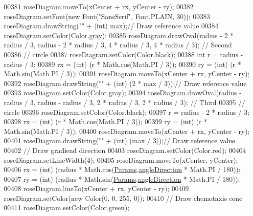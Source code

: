 \begin{DoxyCode}
00381     roseDiagram.moveTo(xCenter + rx, yCenter - ry);
00382     roseDiagram.setFont(\textcolor{keyword}{new} Font(\textcolor{stringliteral}{"SansSerif"}, Font.PLAIN, 30));
00383     roseDiagram.drawString(\textcolor{stringliteral}{""} + (\textcolor{keywordtype}{int}) max);\textcolor{comment}{// Draw reference value}
00384     roseDiagram.setColor(Color.gray);
00385     roseDiagram.drawOval(radius - 2 * radius / 3, radius - 2 * radius / 3, 4 * radius / 3, 4 * radius / 3);
       \textcolor{comment}{// Second}
00386                                                                                                            
       \textcolor{comment}{// circle}
00387     roseDiagram.setColor(Color.black);
00388     \textcolor{keywordtype}{int} r = radius - radius / 3;
00389     rx = (int) (r * Math.cos(Math.PI / 3));
00390     ry = (int) (r * Math.sin(Math.PI / 3));
00391     roseDiagram.moveTo(xCenter + rx, yCenter - ry);
00392     roseDiagram.drawString(\textcolor{stringliteral}{""} + (\textcolor{keywordtype}{int}) (2 * max / 3));\textcolor{comment}{// Draw reference value}
00393     roseDiagram.setColor(Color.gray);
00394     roseDiagram.drawOval(radius - radius / 3, radius - radius / 3, 2 * radius / 3, 2 * radius / 3); \textcolor{comment}{//
       Third}
00395                                                                                                     \textcolor{comment}{//
       circle}
00396     roseDiagram.setColor(Color.black);
00397     r = radius - 2 * radius / 3;
00398     rx = (int) (r * Math.cos(Math.PI / 3));
00399     ry = (int) (r * Math.sin(Math.PI / 3));
00400     roseDiagram.moveTo(xCenter + rx, yCenter - ry);
00401     roseDiagram.drawString(\textcolor{stringliteral}{""} + (\textcolor{keywordtype}{int}) (max / 3));\textcolor{comment}{// Draw reference value}
00402     \textcolor{comment}{// Draw gradiend direction}
00403     roseDiagram.setColor(Color.red);
00404     roseDiagram.setLineWidth(4);
00405     roseDiagram.moveTo(xCenter, yCenter);
00406     rx = (int) (radius * Math.cos(\hyperlink{classdata_1_1_params}{Params}.\hyperlink{classdata_1_1_params_a11ad187f45e1f7add56bde4071bfdf74}{angleDirection} * Math.PI / 180));
00407     ry = (int) (radius * Math.sin(\hyperlink{classdata_1_1_params}{Params}.\hyperlink{classdata_1_1_params_a11ad187f45e1f7add56bde4071bfdf74}{angleDirection} * Math.PI / 180));
00408     roseDiagram.lineTo(xCenter + rx, yCenter - ry);
00409     roseDiagram.setColor(\textcolor{keyword}{new} Color(0, 0, 255, 0));
00410     \textcolor{comment}{// Draw chemotaxis cone}
00411     roseDiagram.setColor(Color.green);

\end{DoxyCode}

